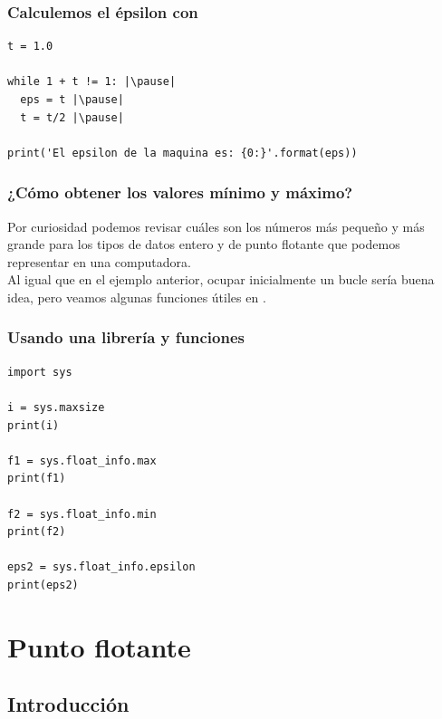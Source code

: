 \documentclass[12pt]{beamer}
\begin{document}
\begin{frame}[fragile]
\frametitle{Calculemos el épsilon con \python}
\begin{lstlisting}[caption=Código para el épsilon]
t = 1.0

while 1 + t != 1: |\pause|
  eps = t |\pause|
  t = t/2 |\pause|

print('El epsilon de la maquina es: {0:}'.format(eps))
\end{lstlisting}
\end{frame}
\begin{frame}
\frametitle{¿Cómo obtener los valores mínimo y máximo?}
Por curiosidad podemos revisar cuáles son los números más pequeño y más grande para los tipos de datos entero y de punto flotante que podemos representar en una computadora.
\\
\bigskip
\pause
Al igual que en el ejemplo anterior, ocupar inicialmente un bucle sería buena idea, pero veamos algunas funciones útiles en \python.
\end{frame}
\begin{frame}
\frametitle{Usando una librería y funciones}
\begin{lstlisting}[caption=Obteniendo valores mínimo y máximo]
import sys

i = sys.maxsize
print(i)

f1 = sys.float_info.max
print(f1)

f2 = sys.float_info.min
print(f2)

eps2 = sys.float_info.epsilon
print(eps2)
\end{lstlisting}
\end{frame}

\section{Punto flotante}
\subsection{Introducción}
\end{document}
